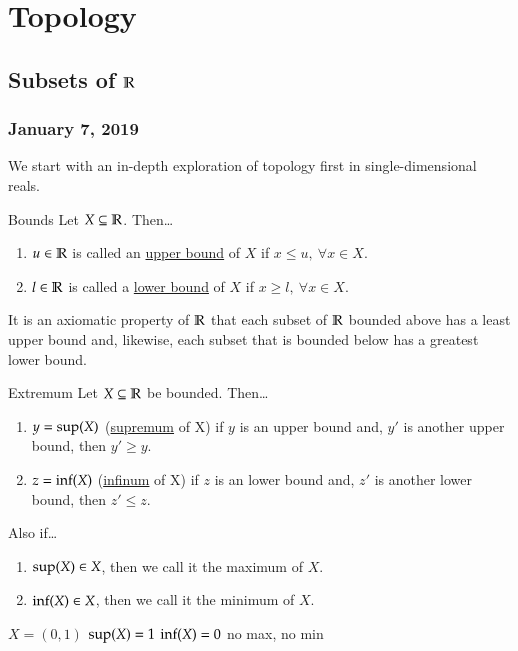 \section{Topology}
\subsection{Subsets of $\mathbb{R}$}
\subsubsection*{January 7, 2019}
We start with an in-depth exploration of topology first in single-dimensional reals.

\begin{defn}{Bounds}
Let $X\subseteq \mathbb{R}$. Then\dots
\begin{enumerate}
	\item $u\in \mathbb{R}$ is called an \ul{upper bound} of $X$ if $x\leq u,\ \forall x\in X$.
	\item $l\in \mathbb{R}$ is called a \ul{lower bound} of $X$ if $x\geq l,\ \forall x\in X$.
\end{enumerate}
\end{defn}

It is an axiomatic property of $\mathbb{R}$ that each subset of $\mathbb{R}$ bounded above has a least upper bound and, likewise, each subset that is bounded below has a greatest lower bound.

\begin{defn}{Extremum}
	Let $X\subseteq \mathbb{R}$ be bounded. Then\dots
	\begin{enumerate}
	\item $y = \mathrm{sup}(X)$ (\ul{supremum} of X) if $y$ is an upper bound and, $y'$ is another upper bound, then $y' \geq y$.
	\item $z = \mathrm{inf}(X)$ (\ul{infinum} of X) if $z$ is an lower bound and, $z'$ is another lower bound, then $z' \leq z$.
\end{enumerate}
Also if\dots
\begin{enumerate}
\item $\mathrm{sup}(X)\in X$, then we call it the maximum of $X$.
\item $\mathrm{inf}(X)\in X$, then we call it the minimum of $X$.
\end{enumerate}
\end{defn}

\example

$X = (0,1)$ \qquad
$\mathrm{sup}(X) = 1$ \qquad
$\mathrm{inf}(X) = 0$ \qquad
no max, no min

